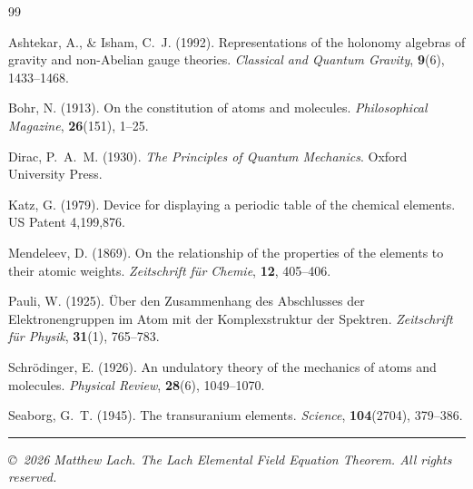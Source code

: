 \documentclass[12pt, a4paper]{article}
\begin{document}
\newpage
\begin{thebibliography}{99}

  Ashtekar, A., \& Isham, C.~J. (1992).
  Representations of the holonomy algebras of gravity and non-Abelian gauge theories.
  \textit{Classical and Quantum Gravity}, \textbf{9}(6), 1433--1468.

  Bohr, N. (1913).
  On the constitution of atoms and molecules.
  \textit{Philosophical Magazine}, \textbf{26}(151), 1--25.

  Dirac, P.~A.~M. (1930).
  \textit{The Principles of Quantum Mechanics}.
  Oxford University Press.

  Katz, G. (1979).
  Device for displaying a periodic table of the chemical elements.
  US Patent 4,199,876.

  Mendeleev, D. (1869).
  On the relationship of the properties of the elements to their atomic weights.
  \textit{Zeitschrift f\"{u}r Chemie}, \textbf{12}, 405--406.

  Pauli, W. (1925).
  \"{U}ber den Zusammenhang des Abschlusses der Elektronengruppen im Atom
  mit der Komplexstruktur der Spektren.
  \textit{Zeitschrift f\"{u}r Physik}, \textbf{31}(1), 765--783.

  Schr\"{o}dinger, E. (1926).
  An undulatory theory of the mechanics of atoms and molecules.
  \textit{Physical Review}, \textbf{28}(6), 1049--1070.

  Seaborg, G.~T. (1945).
  The transuranium elements.
  \textit{Science}, \textbf{104}(2704), 379--386.

\end{thebibliography}

\vspace{1.5cm}
{\color{ruleblue}\rule{\linewidth}{0.6pt}}
\begin{center}
  \small\itshape\color{gray}
  \copyright\ 2026 Matthew Lach.
  The Lach Elemental Field Equation Theorem.
  All rights reserved.
\end{center}
\end{document}
